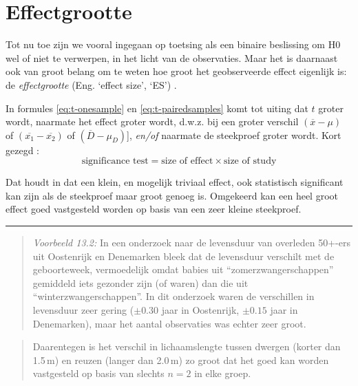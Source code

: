 \documentclass[
]{book}
\begin{document}
\hypertarget{sec:ttoets-effectgrootte}{%
\section{Effectgrootte}\label{sec:ttoets-effectgrootte}}

Tot nu toe zijn we vooral ingegaan op toetsing als een binaire
beslissing om H0 wel of niet te verwerpen, in het licht van de
observaties. Maar het is daarnaast ook van groot belang om te weten hoe
groot het geobserveerde effect eigenlijk is: de \emph{effectgrootte} (Eng.
`effect size', `ES') \citep{Cohen88, Thom02, Naka07}.

In formules \eqref{eq:t-onesample} en \eqref{eq:t-pairedsamples} komt tot uiting
dat \(t\) groter wordt,
naarmate het effect groter wordt, d.w.z. bij een groter verschil
\((\overline{x}-\mu)\) of \((\overline{x_1}-\overline{x_2})\) of
\((\overline{D}-\mu_D)\){]}, \emph{en/of} naarmate de steekproef groter wordt.
Kort gezegd \citep[ p.338, formule 11.10]{Rose08}:
\begin{equation}
  \label{eq:Rose08}
    \textrm{significance test} = 
    \textrm{size of effect} \times \textrm{size of study}
\end{equation}

Dat houdt
in dat een klein, en mogelijk triviaal effect, ook statistisch
significant kan zijn als de steekproef maar groot genoeg is. Omgekeerd
kan een heel groot effect goed vastgesteld worden op basis van een zeer
kleine steekproef.

\begin{center}\rule{0.5\linewidth}{0.5pt}\end{center}

\begin{quote}
\emph{Voorbeeld 13.2:}
In een onderzoek naar de levensduur van overleden 50+-ers uit Oostenrijk
en Denemarken \citep{Dobl99} bleek dat de levensduur verschilt met de
geboorteweek, vermoedelijk omdat babies uit ``zomerzwangerschappen''
gemiddeld iets gezonder zijn (of waren) dan die uit
``winterzwangerschappen''. In dit onderzoek waren de verschillen in
levensduur zeer gering (\(\pm 0.30\) jaar in Oostenrijk, \(\pm 0.15\) jaar
in Denemarken), maar het aantal observaties was echter zeer groot.
\end{quote}

\begin{quote}
Daarentegen is het verschil in lichaamslengte tussen dwergen (korter dan
1.5 m) en reuzen (langer dan 2.0 m) zo groot dat het goed kan worden
vastgesteld op basis van slechts \(n=2\) in elke groep.
\end{quote}
\end{document}
